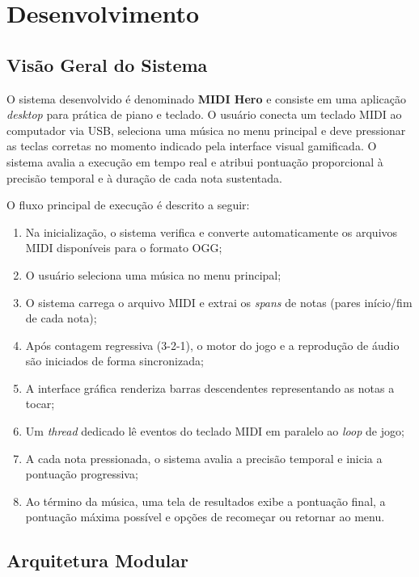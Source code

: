 \documentclass[
  12pt,
  openright,
  twoside,
  a4paper,
  english,
  brazil
]{abntex2}
\begin{document}
\chapter{Desenvolvimento}

\section{Visão Geral do Sistema}

O sistema desenvolvido é denominado \textbf{MIDI Hero} e consiste em
uma aplicação \textit{desktop} para prática de piano e teclado. O
usuário conecta um teclado MIDI ao computador via USB, seleciona uma
música no menu principal e deve pressionar as teclas corretas no momento
indicado pela interface visual gamificada. O sistema avalia a execução
em tempo real e atribui pontuação proporcional à precisão temporal e à
duração de cada nota sustentada.

O fluxo principal de execução é descrito a seguir:

\begin{enumerate}
  \item Na inicialização, o sistema verifica e converte automaticamente
        os arquivos MIDI disponíveis para o formato OGG;
  \item O usuário seleciona uma música no menu principal;
  \item O sistema carrega o arquivo MIDI e extrai os
        \textit{spans} de notas (pares início/fim de cada nota);
  \item Após contagem regressiva (3-2-1), o motor do jogo e a reprodução
        de áudio são iniciados de forma sincronizada;
  \item A interface gráfica renderiza barras descendentes representando
        as notas a tocar;
  \item Um \textit{thread} dedicado lê eventos do teclado MIDI em
        paralelo ao \textit{loop} de jogo;
  \item A cada nota pressionada, o sistema avalia a precisão temporal e
        inicia a pontuação progressiva;
  \item Ao término da música, uma tela de resultados exibe a pontuação
        final, a pontuação máxima possível e opções de recomeçar ou
        retornar ao menu.
\end{enumerate}

\section{Arquitetura Modular}
\end{document}

